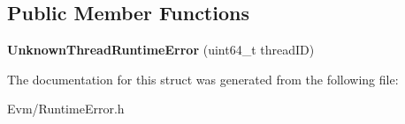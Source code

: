 \subsection*{Public Member Functions}
\begin{DoxyCompactItemize}
\item 
\mbox{\label{struct_evm_1_1_unknown_thread_runtime_error_a164ba16dc562271cad2bb58121f53831}} 
{\bfseries Unknown\+Thread\+Runtime\+Error} (uint64\+\_\+t thread\+ID)
\end{DoxyCompactItemize}


The documentation for this struct was generated from the following file\+:\begin{DoxyCompactItemize}
\item 
Evm/Runtime\+Error.\+h\end{DoxyCompactItemize}
